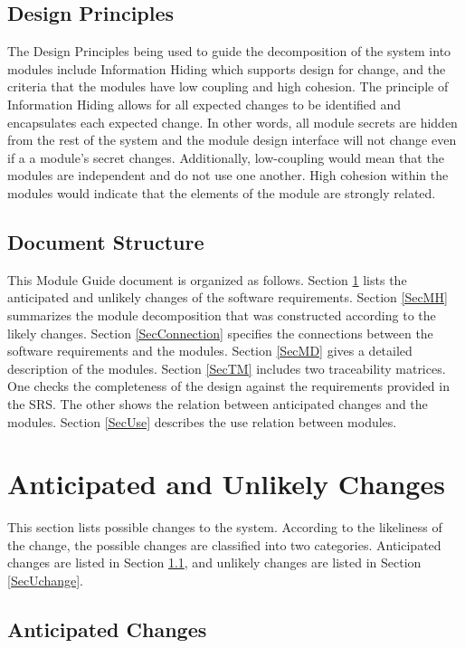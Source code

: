 \documentclass[12pt, titlepage]{article}
\begin{document}
\subsection{Design Principles}

The Design Principles being used to guide the decomposition of the system into modules include Information Hiding which supports design for change, and the criteria that the modules have low coupling and high cohesion. The principle of Information Hiding allows for all expected changes to be identified and encapsulates each expected change. In other words, all module secrets are hidden from the rest of the system and the module design interface will not change even if a a module's secret changes. Additionally, low-coupling would mean that the modules are independent and do not use one another. High cohesion within the modules would indicate that the elements of the module are strongly related. 

\subsection{Document Structure}

This Module Guide document is organized as follows. Section
\ref{SecChange} lists the anticipated and unlikely changes of the software
requirements. Section \ref{SecMH} summarizes the module decomposition that
was constructed according to the likely changes. Section \ref{SecConnection}
specifies the connections between the software requirements and the
modules. Section \ref{SecMD} gives a detailed description of the
modules. Section \ref{SecTM} includes two traceability matrices. One checks
the completeness of the design against the requirements provided in the SRS. The
other shows the relation between anticipated changes and the modules. Section
\ref{SecUse} describes the use relation between modules.

\section{Anticipated and Unlikely Changes} \label{SecChange}

This section lists possible changes to the system. According to the likeliness
of the change, the possible changes are classified into two
categories. Anticipated changes are listed in Section \ref{SecAchange}, and
unlikely changes are listed in Section \ref{SecUchange}.

\subsection{Anticipated Changes} \label{SecAchange}
\end{document}
